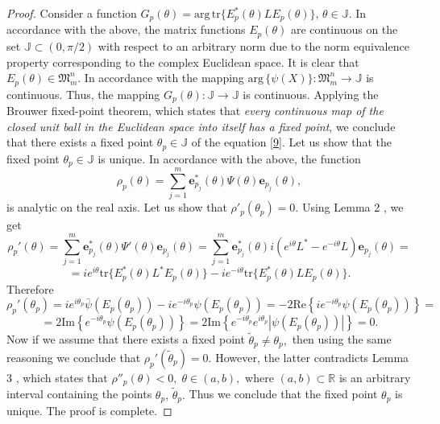 \documentclass[a4paper,twoside,12pt]{article}
\begin{document}
\begin{proof}
Consider a function
$
G_{p}(\theta)=\mathrm{arg}\, \mathrm{tr}\{E^{\ast}_{p}(\theta)LE_{p}(\theta)\},\,\theta\in \mathbb{J}.
$
In accordance with the above,  the matrix functions $E_{p}(\theta)$ are continuous on the set $\mathbb{J}\subset (0,\pi/2)$  with respect to an arbitrary norm due to the norm  equivalence property corresponding to  the complex Euclidean space.   It is clear that  $E_{p}(\theta)\in \mathfrak{M}_{m}^{n}.$ In accordance with  \cite{KABaChu26}
the mapping $\mathrm{arg} \,\{\psi(X)\}:\mathfrak{M}_{m}^{n}\rightarrow \mathbb{J}$ is continuous. Thus, the mapping $G_{p}(\theta):\mathbb{J} \rightarrow \mathbb{J}$ is    continuous.   Applying the Brouwer fixed-point theorem, which states that   {\it  every continuous map of the closed unit
 ball in the Euclidean space into itself has a fixed point},  we conclude that   there exists a fixed point $\theta_{p}\in \mathbb{J}$ of  the equation \eqref{9}.
      Let us show that the  fixed point $\theta_{p}\in \mathbb{J}$ is unique. In accordance with the above,  the function
$$
\rho_{p}(\theta) =\sum\limits_{j=1}^{m}\mathbf{e}^{\ast}_{ p_{j} }(\theta)\Psi(\theta)\mathbf{e}_{ p_{j} }(\theta),
$$
  is analytic on the real axis.   Let us show that $\rho'_{p}(\theta_{p})=0.$
Using Lemma 2  \cite{KABaChu26}, we get
$$
\rho_{p}'(\theta)= \sum\limits_{j=1}^{m}\mathbf{e}^{\ast}_{p_{j}}\!(\theta)\Psi'(\theta)\mathbf{e} _{p_{j}}(\theta)=
\sum\limits_{j=1}^{m}\mathbf{e}^{\ast}_{p_{j}}\!(\theta)i\left(e^{i\theta}L^{\ast}-e^{-i\theta}L \right)  \mathbf{e} _{p_{j}}(\theta)=
$$
$$
=ie^{i\theta}\mathrm{tr}\{E^{\ast}_{p}(\theta)L^{\ast}E_{p}(\theta)\}-ie^{-i\theta}\mathrm{tr}\{E^{\ast}_{p}(\theta)LE_{p}(\theta)\}.
$$
Therefore
$$
\rho_{p}'(\theta_{p})=ie^{i\theta_{p}}\bar{\psi} (E_{p}(\theta_{p})) -i e^{-i\theta_{p}} \psi  (E_{p}(\theta_{p}))=-2\mathrm{Re}\left\{ie^{-i\theta_{p}} \psi  (E_{p}(\theta_{p})) \right\}=
$$
$$
=2\mathrm{Im}\left\{ e^{-i\theta_{p}} \psi  (E_{p}(\theta_{p})) \right\} =2\mathrm{Im}\left\{ e^{-i\theta_{p}}e^{ i\theta_{p}} |\psi  (E_{p}(\theta_{p}))| \right\}=0.
$$
Now if we assume that there exists a fixed point $\tilde{\theta}_{p}\neq \theta_{p},$ then using the same reasoning  we conclude that $\rho_{p}'(\tilde{\theta}_{p})=0.$ However, the latter contradicts   Lemma 3 \cite{KABaChu26}, which states  that  $\rho''_{p}(\theta)<0,\;\theta\in (a,b),$  where  $(a,b)\subset \mathbb{R}$ is an arbitrary interval containing the points $ \theta_{p},\,\tilde{\theta}_{p}.$   Thus we conclude that the fixed point $\theta_{p}$ is unique. The proof is complete.
\end{proof}
\end{document}
